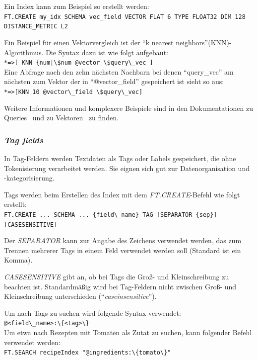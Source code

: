Ein Index kann zum Beispiel so erstellt werden:\\
\lstinline|FT.CREATE my_idx SCHEMA vec_field VECTOR FLAT 6 TYPE FLOAT32 DIM 128 | \\\lstinline|DISTANCE_METRIC L2|

Ein Beispiel für einen Vektorvergleich ist der \enquote{k nearest neighbors}(KNN)-Algorithmus. Die Syntax dazu ist wie folgt aufgebaut:\\
\lstinline+*=>[ KNN {num|\$num @vector \$query\_vec ]+\\
Eine Abfrage nach den zehn nächsten Nachbarn bei denen \enquote{query\_vec} am nächsten zum Vektor der in \enquote{@vector\_field} gespeichert ist sieht so aus:\\
\lstinline+*=>[KNN 10 @vector\_field \$query\_vec]+

Weitere Informationen und komplexere Beispiele sind in den Dokumentationen zu Queries~\cite{redis_ltd_query_nodate} und zu Vektoren~\cite{redis_ltd_vectors_nodate} zu finden.


\subsubsection{\emph{Tag fields}} In Tag-Feldern werden Textdaten als Tags oder Labels gespeichert, die ohne Tokenisierung verarbeitet werden. Sie eignen sich gut zur Datenorganisation und -kategorisierung.

Tags werden beim Erstellen des Index mit dem \emph{FT.CREATE}-Befehl wie folgt erstellt:\\
\lstinline|FT.CREATE ... SCHEMA ... {field\_name} TAG [SEPARATOR {sep}] [CASESENSITIVE]|

Der \emph{SEPARATOR} kann zur Angabe des Zeichens verwendet werden, das zum Trennen mehrerer Tags in einem Feld verwendet werden soll (Standard ist ein Komma).

\emph{CASESENSITIVE} gibt an, ob bei Tags die Groß- und Kleinschreibung zu beachten ist. Standardmäßig wird bei Tag-Feldern nicht zwischen Groß- und Kleinschreibung unterschieden (\enquote{\emph{caseinsensitive}}).

Um nach Tags zu suchen wird folgende Syntax verwendet:\\
\lstinline|@<field\_name>:\{<tag>\}|\\
Um etwa nach Rezepten mit Tomaten als Zutat zu suchen, kann folgender Befehl verwendet werden:\\
\lstinline|FT.SEARCH recipeIndex "@ingredients:\{tomato\}"|


